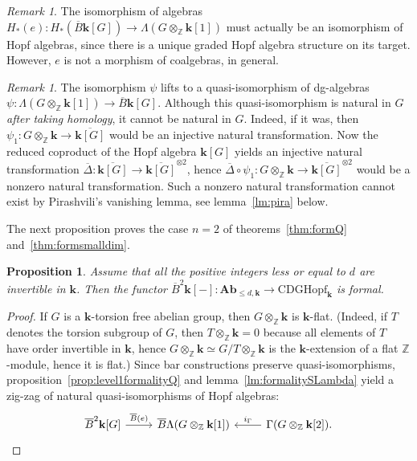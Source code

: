 \documentclass{amsart}
\newtheorem{proposition}[formula]{Proposition}
\theoremstyle{definition}
\theoremstyle{remark}
\newtheorem{remark}[formula]{Remark}
\newcommand{\Z}{\mathbb Z}
\renewcommand{\le}{\leqslant}
\newcommand{\Ab}{\mathbf{Ab}}
\def\k{\mathbf{k}}
\begin{document}
\begin{remark}
	The isomorphism of algebras $H_*(e):H_*(\overline{B}\k[G])\to \Lambda(G\otimes_\Z\k[1])$
	must actually be an isomorphism of Hopf algebras, since there is a unique graded Hopf algebra structure on its target. However, $e$ is not a morphism of coalgebras, in general.
\end{remark}
\begin{remark}
	The isomorphism $\psi$ lifts to a quasi-isomorphism of dg-algebras $\psi\colon\Lambda(G\otimes_{\mathbb{Z}}\k[1])\to \overline{B}\k[G]$. Although this quasi-isomorphism is natural in $G$ \emph{after taking homology}, it cannot be natural in $G$. Indeed, if it was, then $\psi_{1}\colon G\otimes_{\Z}\k\to \overline{\k[G]}$ would be an injective natural transformation. Now the reduced coproduct of the Hopf algebra $\k[G]$ yields an injective natural transformation $\overline{\Delta}\colon\overline{\k[G]}\to \overline{\k[G]}^{\otimes 2}$, hence $\overline{\Delta}\circ\psi_{1}\colon G\otimes_{\Z}\k\to \overline{\k[G]}^{\otimes 2}$ would be a nonzero natural transformation. Such a nonzero natural transformation cannot exist by Pirashvili's vanishing lemma, see lemma~\ref{lm:pira} below.
\end{remark}
The next proposition proves the case $n=2$ of theorems~\ref{thm:formQ} and~\ref{thm:formsmalldim}.
\begin{proposition}
	\label{prop:level2formalityQ}
	Assume that all the positive integers less or equal to $d$ are invertible in $\k$. 
	Then the functor $\overline{B}^2\k[-]:\Ab_{\le d,\k}\to \mathrm{CDGHopf}_\k$ is formal.
\end{proposition}
\begin{proof}
	If $G$ is a $\k$-torsion free abelian group, then $G\otimes_\Z\k$ is $\k$-flat. (Indeed, if $T$ denotes the torsion subgroup of $G$, then $T\otimes_\Z\k=0$ because all elements of $T$ have order invertible in $\k$, hence $G\otimes_\Z\k\simeq G/T\otimes_\Z\k$ is the $\k$-extension of a flat $\Z$-module, hence it is flat.) 
	Since bar constructions preserve quasi-isomorphisms, proposition~\ref{prop:level1formalityQ} and lemma~\ref{lm:formalitySLambda} yield a zig-zag of natural quasi-isomorphisms of Hopf algebras: 
	\[
    \begin{tikzcd}
    \overline{B}^2\k[G] \arrow{r}{\overline{B}(e)} &
    \overline{B}\Lambda(G\otimes_\Z\k[1]) &
    \Gamma(G\otimes_\Z\k[2]) \arrow[swap]{l}{i_\Gamma}.
    \end{tikzcd}
    \]
\end{proof}
\end{document}
